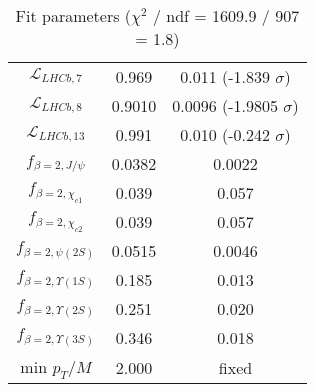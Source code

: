 \begin{table}[h!]
\begin{tabular}{c|c|c}
$\mathcal L_{LHCb,7}$ & 0.969 & 0.011 (-1.839 $\sigma$) \\
$\mathcal L_{LHCb,8}$ & 0.9010 & 0.0096 (-1.9805 $\sigma$) \\
$\mathcal L_{LHCb,13}$ & 0.991 & 0.010 (-0.242 $\sigma$) \\
$f_{\beta=2,J/\psi}$ & 0.0382 & 0.0022 \\
$f_{\beta=2,\chi_{c1}}$ & 0.039 & 0.057 \\
$f_{\beta=2,\chi_{c2}}$ & 0.039 & 0.057 \\
$f_{\beta=2,\psi(2S)}$ & 0.0515 & 0.0046 \\
$f_{\beta=2,\Upsilon(1S)}$ & 0.185 & 0.013 \\
$f_{\beta=2,\Upsilon(2S)}$ & 0.251 & 0.020 \\
$f_{\beta=2,\Upsilon(3S)}$ & 0.346 & 0.018 \\
min $p_T/M$ & 2.000 & fixed \\
\end{tabular}
\caption{Fit parameters ($\chi^2$ / ndf = 1609.9 / 907 = 1.8)}
\end{table}
